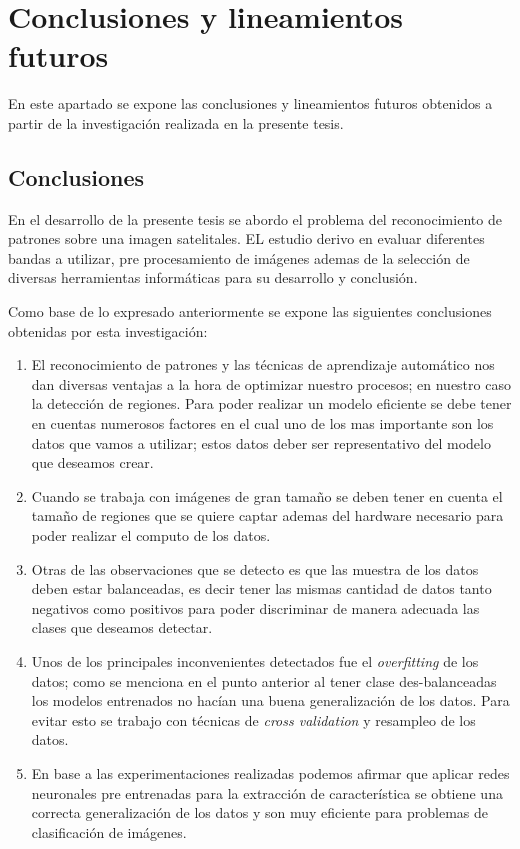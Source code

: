 \chapter{Conclusiones y lineamientos futuros}\label{chap:conclusiones}
En este apartado se expone las conclusiones y lineamientos futuros obtenidos a partir de la investigación realizada en la presente tesis. 

\section{Conclusiones}
En el desarrollo de la presente tesis se abordo el problema del reconocimiento de patrones sobre una imagen satelitales. EL estudio derivo en evaluar diferentes bandas a utilizar, pre procesamiento de imágenes ademas de la selección de diversas herramientas informáticas para su desarrollo y conclusión.

Como base de lo expresado anteriormente se expone las siguientes conclusiones obtenidas por esta investigación:
\begin{enumerate}
\item El reconocimiento de patrones y las técnicas de aprendizaje automático nos dan diversas ventajas a la hora de optimizar nuestro procesos; en nuestro caso la detección de regiones. Para poder realizar un modelo eficiente se debe tener en cuentas numerosos factores en el cual uno de los mas importante son los datos que vamos a utilizar; estos datos deber ser representativo del modelo que deseamos crear.

\item Cuando se trabaja con imágenes de gran tamaño se deben tener en cuenta el tamaño de regiones que se quiere captar ademas del hardware necesario para poder realizar el computo de los datos.

\item Otras de las observaciones que se detecto es que las muestra de los datos deben estar balanceadas, es decir tener las mismas cantidad de datos tanto negativos como positivos para poder discriminar de manera adecuada las clases que deseamos detectar.

\item Unos de los principales inconvenientes detectados fue el \textit{overfitting} de los datos; como se menciona en el punto anterior al tener clase des-balanceadas los modelos entrenados no hacían una buena generalización de los datos. Para evitar esto se trabajo con técnicas de \textit{cross validation} y resampleo de los datos.

\item En base a las experimentaciones realizadas podemos afirmar que aplicar redes neuronales pre entrenadas para la extracción de característica se obtiene una correcta generalización de los datos y son muy eficiente para problemas de clasificación de imágenes.

\end{enumerate}

